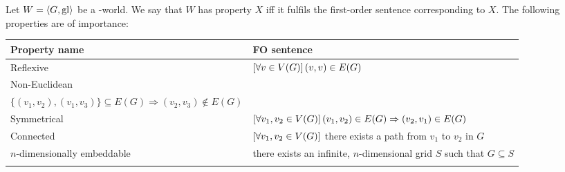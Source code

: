 \begin{definition}
	Let $W = \langle G,\mathrm{gl} \rangle$ be a \wext-world. We say that $W$ has property $X$ iff it fulfils the first-order sentence corresponding to $X$. The following properties are of importance:
	
	

	\begin{center}
		\begin{tabular}[b]{l l}
		\toprule
		\textbf{Property name} & \textbf{FO sentence}\\
		\midrule\addlinespace[0.7em]
		Reflexive & $\left[\forall v \in V(G) \right] (v,v) \in E(G)$\\ \addlinespace[0.7em]
		Non-Euclidean &
		\begin{minipage}[t]{0.65\textwidth}
			$\allQ{\textit{ pairwise distinct } v_1,v_2,v_3 \in V(G)}$\\$\{(v_1,v_2),(v_1,v_3)\} \subseteq E(G) \Rightarrow (v_2,v_3) \notin E(G)$
		\end{minipage}\\ \addlinespace[0.7em]
		Symmetrical & $\left[\forall v_1,v_2 \in V(G) \right] (v_1,v_2) \in E(G) \Rightarrow (v_2,v_1) \in E(G)$\\ \addlinespace[0.7em]
		Connected & $\left[\forall v_1,v_2 \in V(G) \right]$ there exists a path from $v_1$ to $v_2$ in $G$\\ \addlinespace[0.7em]
		
		$n$-dimensionally embeddable &
		there exists an infinite, $n$-dimensional grid $S$ such that $G \subseteq S$\footnotemark
		
		\\ \addlinespace[0.5em]
		\bottomrule
		
		\end{tabular}
	\end{center}
\end{definition}


